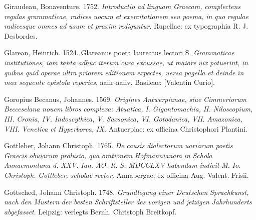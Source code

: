 \documentclass[output=paper]{langsci/langscibook}
\begin{document}
Giraudeau, Bonaventure. 1752. \textit{Introductio} \textit{ad} \textit{linguam} \textit{Graecam,} \textit{complectens} \textit{regulas} \textit{grammaticae,} \textit{radices} \textit{uocum} \textit{et} \textit{exercitationem} \textit{seu} \textit{poema,} \textit{in} \textit{quo} \textit{regulae} \textit{radicesque} \textit{omnes} \textit{ad} \textit{usum} \textit{et} \textit{praxim} \textit{rediguntur}. Rupellae: ex typographia R. J. Desbordes.

Glarean, Heinrich. 1524. Glareanus poeta laureatus lectori S. \textit{Grammaticae} \textit{institutiones,} \textit{iam} \textit{tanta} \textit{adhuc} \textit{iterum} \textit{cura} \textit{excussae,} \textit{ut} \textit{maiore} \textit{uix} \textit{potuerint,} \textit{in} \textit{quibus} \textit{quid} \textit{operae} \textit{ultra} \textit{priorem} \textit{editionem} \textit{expectes,} \textit{uersa} \textit{pagella} \textit{et} \textit{deinde} \textit{in} \textit{mox} \textit{sequente} \textit{epistola} \textit{reperies}, aaiir-aaiiv. Basileae: [Valentin Curio].

Goropius Becanus, Johannes. 1569. \textit{Origines} \textit{Antwerpianae,} \textit{siue} \textit{Cimmeriorum} \textit{Becceselana} \textit{nouem} \textit{libros} \textit{complexa:} \textit{Atuatica,} \textit{I.} \textit{Gigantomachia,} \textit{II.} \textit{Niloscopium,} \textit{III.} \textit{Cronia,} \textit{IV.} \textit{Indoscythica,} \textit{V.} \textit{Saxsonica,} \textit{VI.} \textit{Gotodanica,} \textit{VII.} \textit{Amazonica,} \textit{VIII.} \textit{Venetica} \textit{et} \textit{Hyperborea,} \textit{IX.} Antuerpiae: ex officina Christophori Plantini.

Gottleber, Johann Christoph. 1765. \textit{De} \textit{causis} \textit{dialectorum} \textit{uariarum} \textit{poetis} \textit{Graecis} \textit{obuiarum} \textit{prolusio,} \textit{qua} \textit{orationem} \textit{Hofmannianam} \textit{in} \textit{Schola} \textit{Annaemontana} \textit{d.} \textit{XXV.} \textit{Ian.} \textit{AO.} \textit{R.} \textit{S.} \textit{MDCCLXV} \textit{habendam} \textit{indicit} \textit{M.} \textit{Io.} \textit{Christoph.} \textit{Gottleber,} \textit{scholae} \textit{rector}. Annabergae: ex officina Aug. Valent. Frisii.

Gottsched, Johann Christoph. 1748. \textit{Grundlegung} \textit{einer} \textit{Deutschen} \textit{Sprachkunst,} \textit{nach} \textit{den} \textit{Mustern} \textit{der} \textit{besten} \textit{Schriftsteller} \textit{des} \textit{vorigen} \textit{und} \textit{jetzigen} \textit{Jahrhunderts} \textit{abgefasset}. Leipzig: verlegts Bernh. Christoph Breitkopf.
\end{document}

